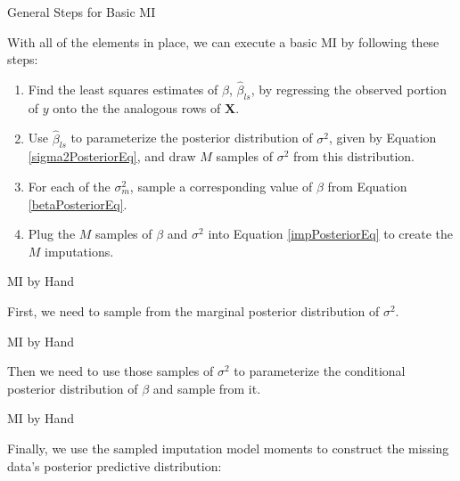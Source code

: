 \documentclass[table]{beamer}
\begin{document}
  
\begin{frame}{General Steps for Basic MI}
  
  With all of the elements in place, we can execute a basic MI by
  following these steps:
  \vspace{6pt}
  \begin{enumerate}
  \item Find the least squares estimates of $\beta$,
    $\hat{\beta}_{ls}$, by regressing the observed portion of $y$
    onto the the analogous rows of $\mathbf{X}$.
    \vspace{6pt}
  \item Use $\hat{\beta}_{ls}$ to parameterize the posterior
    distribution of $\sigma^2$, given by Equation
    \ref{sigma2PosteriorEq}, and draw $M$ samples of $\sigma^2$ from
    this distribution.
    \vspace{6pt}
  \item For each of the $\sigma^2_m$, sample a corresponding value of
    $\beta$ from Equation \ref{betaPosteriorEq}.
    \vspace{6pt}
  \item Plug the $M$ samples of $\beta$ and $\sigma^2$ into Equation
    \ref{impPosteriorEq} to create the $M$ imputations.
  \end{enumerate}
  
\end{frame}


\begin{frame}{MI by Hand}
      
  First, we need to sample from the marginal posterior distribution of
  $\sigma^2$.
  


\end{frame}


\begin{frame}{MI by Hand}
  
  Then we need to use those samples of $\sigma^2$ to parameterize the
  conditional posterior distribution of $\beta$ and sample from it.
  


\end{frame}


\begin{frame}{MI by Hand}
  
  Finally, we use the sampled imputation model moments to construct
  the missing data's posterior predictive distribution:
  


\end{frame}
\end{document}
